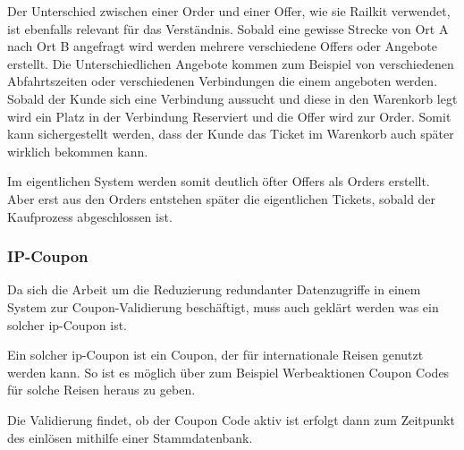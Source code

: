 Der Unterschied zwischen einer Order und einer Offer, wie sie Railkit verwendet, ist ebenfalls relevant für das Verständnis. Sobald eine gewisse Strecke von Ort A nach Ort B angefragt wird werden mehrere verschiedene Offers oder Angebote erstellt. Die Unterschiedlichen Angebote kommen zum Beispiel von verschiedenen Abfahrtszeiten oder verschiedenen Verbindungen die einem angeboten werden. Sobald der Kunde sich eine Verbindung aussucht und diese in den Warenkorb legt wird ein Platz in der Verbindung Reserviert und die Offer wird zur Order. Somit kann sichergestellt werden, dass der Kunde das Ticket im Warenkorb auch später wirklich bekommen kann.

Im eigentlichen System werden somit deutlich öfter Offers als Orders erstellt. Aber erst aus den Orders entstehen später die eigentlichen Tickets, sobald der Kaufprozess abgeschlossen ist.

\subsubsection{IP-Coupon}

Da sich die Arbeit um die Reduzierung redundanter Datenzugriffe in einem System zur Coupon-Validierung beschäftigt, muss auch geklärt werden was ein solcher \ac{ip}-Coupon ist. 

Ein solcher \ac{ip}-Coupon ist ein Coupon, der für internationale Reisen genutzt werden kann. So ist es möglich über zum Beispiel Werbeaktionen Coupon Codes für solche Reisen heraus zu geben.

Die Validierung findet, ob der Coupon Code aktiv ist erfolgt dann zum Zeitpunkt des einlösen mithilfe einer Stammdatenbank. %